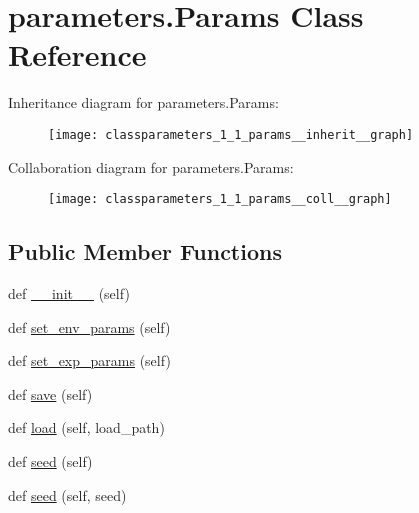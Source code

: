 \hypertarget{classparameters_1_1_params}{}\section{parameters.\+Params Class Reference}
\label{classparameters_1_1_params}


Inheritance diagram for parameters.\+Params\+:
\nopagebreak
\begin{figure}[H]
\begin{center}
\leavevmode
\texttt{[image: classparameters\_1\_1\_params\_\_inherit\_\_graph]}
\end{center}
\end{figure}


Collaboration diagram for parameters.\+Params\+:
\nopagebreak
\begin{figure}[H]
\begin{center}
\leavevmode
\texttt{[image: classparameters\_1\_1\_params\_\_coll\_\_graph]}
\end{center}
\end{figure}
\subsection*{Public Member Functions}
\begin{DoxyCompactItemize}
\item 
def \hyperlink{classparameters_1_1_params_a988af4b5cf76cea5f4be239ce48dbdcd}{\+\_\+\+\_\+init\+\_\+\+\_\+} (self)
\item 
def \hyperlink{classparameters_1_1_params_aafd5b394baf4029adfde7025740ac725}{set\+\_\+env\+\_\+params} (self)
\item 
def \hyperlink{classparameters_1_1_params_a79ac61f919322010338c407a97539755}{set\+\_\+exp\+\_\+params} (self)
\item 
def \hyperlink{classparameters_1_1_params_af62177999f21802b8e7833e0c4d4c2e5}{save} (self)
\item 
def \hyperlink{classparameters_1_1_params_adc40f046f07a1daf24ab1457639f5fbb}{load} (self, load\+\_\+path)
\item 
def \hyperlink{classparameters_1_1_params_ab165f67ffccc266fd0cbb3191ed2a84c}{seed} (self)
\item 
def \hyperlink{classparameters_1_1_params_a960731a117dc8297774ebb2895a9e2ff}{seed} (self, seed)
\end{DoxyCompactItemize}
